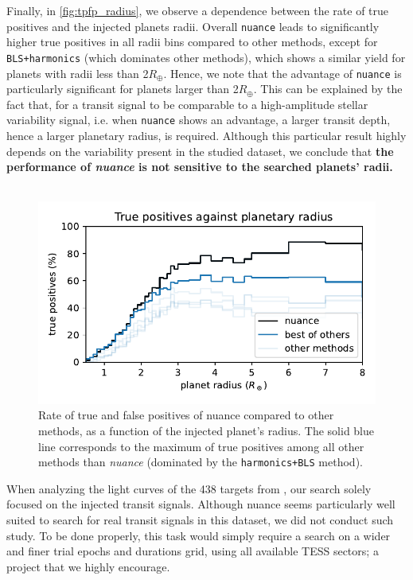 \documentclass[modern,linenumbers]{aastex631}
\newcommand{\nuancemethod}{\textit{nuance}}
\newcommand{\nuance}{\nuancemethod{}}
\newcommand{\nuancecode}{\textsf{nuance}}
\newcommand{\review}[1]{#1}
\begin{document}
\review{Finally, in \autoref{fig:tpfp_radius}, we observe a dependence between the rate of true positives and the injected planets radii. Overall \texttt{nuance} leads to significantly higher true positives in all radii bins compared to other methods, except for \texttt{BLS+harmonics} (which dominates other methods), which shows a similar yield for planets with radii less than 2$R_\oplus$. Hence, we note that the advantage of \texttt{nuance} is particularly significant for planets larger than 2$R_\oplus$. This can be explained by the fact that, for a transit signal to be comparable to a high-amplitude stellar variability signal, i.e. when \texttt{nuance} shows an advantage, a larger transit depth, hence a larger planetary radius, is required. Although this particular result highly depends on the variability present in the studied dataset, we conclude that \textbf{the performance of \nuance{} is not sensitive to the searched planets' radii.}}\\\\
\begin{figure}[H]
    \begin{centering}
        \includegraphics[width=0.6\linewidth]{../workflows/tess_injection_recovery/figures/tpfp_radius.pdf}
        \caption{\review{Rate of true and false positives of \nuancecode{} compared to other methods, as a function of the injected planet's radius. The solid blue line corresponds to the maximum of true positives among all other methods than \nuance{} (dominated by the \texttt{harmonics+BLS} method).}{}}
        \label{fig:tpfp_radius}
    \end{centering}
\end{figure}
\review{When analyzing the light curves of the 438 targets from \citealt{Ramsay2020}, our search solely focused on the injected transit signals. Although \nuancecode{} seems particularly well suited to search for real transit signals in this dataset, we did not conduct such study. To be done properly, this task would simply require a search on a wider and finer trial epochs and durations grid, using all available TESS sectors; a project that we highly encourage.}{}
\end{document}
